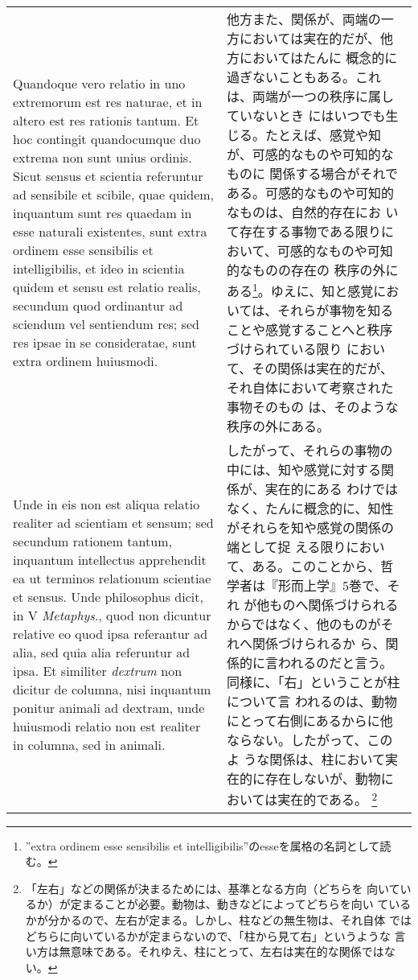 \documentclass[paper=a4paper,fontsize=10pt,jafontsize=9pt,titlepage]{jlreq}
\begin{document}
\begin{longtable}{p{21em}p{21em}}
\\

Quandoque vero relatio in uno extremorum est res naturae, et in altero
est res rationis tantum. Et hoc contingit quandocumque duo extrema non
sunt unius ordinis. Sicut sensus et scientia referuntur ad sensibile
et scibile, quae quidem, inquantum sunt res quaedam in esse naturali
existentes, sunt extra ordinem esse sensibilis et intelligibilis, et
ideo in scientia quidem et sensu est relatio realis, secundum quod
ordinantur ad sciendum vel sentiendum res; sed res ipsae in se
consideratae, sunt extra ordinem huiusmodi.

&

他方また、関係が、両端の一方においては実在的だが、他方においてはたんに
概念的に過ぎないこともある。これは、両端が一つの秩序に属していないとき
にはいつでも生じる。たとえば、感覚や知が、可感的なものや可知的なものに
関係する場合がそれである。可感的なものや可知的なものは、自然的存在にお
いて存在する事物である限りにおいて、可感的なものや可知的なものの存在の
秩序の外にある\footnote{''extra ordinem esse sensibilis et
intelligibilis''のesseを属格の名詞として読む。}。ゆえに、知と感覚にお
いては、それらが事物を知ることや感覚することへと秩序づけられている限り
において、その関係は実在的だが、それ自体において考察された事物そのもの
は、そのような秩序の外にある。

\\

Unde in eis non est aliqua relatio realiter ad scientiam et sensum;
sed secundum rationem tantum, inquantum intellectus apprehendit ea ut
terminos relationum scientiae et sensus. Unde philosophus dicit, in V
{\itshape Metaphys}., quod non dicuntur relative eo quod ipsa
referantur ad alia, sed quia alia referuntur ad ipsa. Et similiter
{\itshape dextrum} non dicitur de columna, nisi inquantum ponitur
animali ad dextram, unde huiusmodi relatio non est realiter in
columna, sed in animali.

&

したがって、それらの事物の中には、知や感覚に対する関係が、実在的にある
わけではなく、たんに概念的に、知性がそれらを知や感覚の関係の端として捉
える限りにおいて、ある。このことから、哲学者は『形而上学』5巻で、それ
が他ものへ関係づけられるからではなく、他のものがそれへ関係づけられるか
ら、関係的に言われるのだと言う。同様に、「右」ということが柱について言
われるのは、動物にとって右側にあるからに他ならない。したがって、このよ
うな関係は、柱において実在的に存在しないが、動物においては実在的である。
\footnote{「左右」などの関係が決まるためには、基準となる方向（どちらを
向いているか）が定まることが必要。動物は、動きなどによってどちらを向い
ているかが分かるので、左右が定まる。しかし、柱などの無生物は、それ自体
ではどちらに向いているかが定まらないので、「柱から見て右」というような
言い方は無意味である。それゆえ、柱にとって、左右は実在的な関係ではない。}


\end{longtable}
\end{document}
